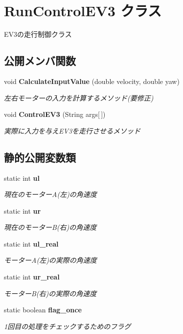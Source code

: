 \section{Run\-Control\-E\-V3 クラス}
\label{class_run_control_e_v3}


E\-V3の走行制御クラス  


\subsection*{公開メンバ関数}
\begin{DoxyCompactItemize}
\item 
void {\bf Calculate\-Input\-Value} (double velocity, double yaw)
\begin{DoxyCompactList}\small\item\em 左右モーターの入力を計算するメソッド(要修正) \end{DoxyCompactList}\item 
void {\bf Control\-E\-V3} (String args[$\,$])
\begin{DoxyCompactList}\small\item\em 実際に入力を与え\-E\-V3を走行させるメソッド \end{DoxyCompactList}\end{DoxyCompactItemize}
\subsection*{静的公開変数類}
\begin{DoxyCompactItemize}
\item 
static int {\bf ul}
\begin{DoxyCompactList}\small\item\em 現在のモーター\-A(左)の角速度 \end{DoxyCompactList}\item 
static int {\bf ur}
\begin{DoxyCompactList}\small\item\em 現在のモーター\-B(右)の角速度 \end{DoxyCompactList}\item 
static int {\bf ul\-\_\-real}
\begin{DoxyCompactList}\small\item\em モーター\-A(左)の実際の角速度 \end{DoxyCompactList}\item 
static int {\bf ur\-\_\-real}
\begin{DoxyCompactList}\small\item\em モーター\-B(右)の実際の角速度 \end{DoxyCompactList}\item 
static boolean {\bf flag\-\_\-once}
\begin{DoxyCompactList}\small\item\em 1回目の処理をチェックするためのフラグ \end{DoxyCompactList}\end{DoxyCompactItemize}


